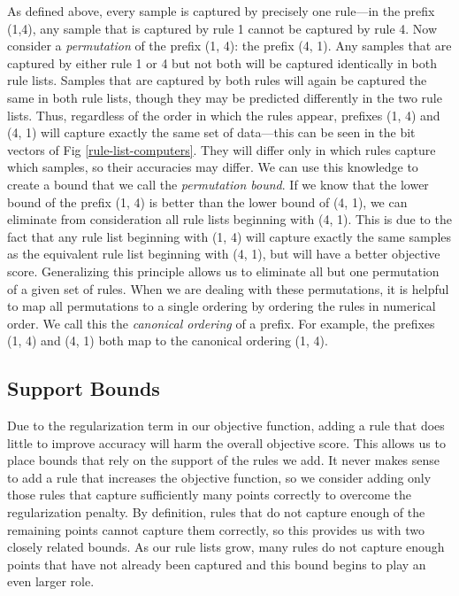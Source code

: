 As defined above, every sample is captured by precisely one rule---in the prefix (1,4), any sample that is captured by rule 1 cannot be captured by rule 4. 
Now consider a \textit{permutation} of the prefix (1, 4): the prefix (4, 1).
Any samples that are captured by either rule 1 or 4 but not both will be captured identically in both rule lists.
Samples that are captured by both rules will again be captured the same in both rule lists, though they may be predicted differently in the two rule lists.
Thus, regardless of the order in which the rules appear, prefixes (1, 4) and (4, 1) will capture exactly the same set of data---this can be seen in the bit vectors of Fig \ref{rule-list-computers}.
They will differ only in which rules capture which samples, so their accuracies may differ.
We can use this knowledge to create a bound that we call the \textit{permutation bound}.
If we know that the lower bound of the prefix (1, 4) is better than the lower bound of (4, 1), we can eliminate from consideration all rule lists beginning with (4, 1).
This is due to the fact that any rule list beginning with (1, 4) will capture exactly the same samples as the equivalent rule list beginning with (4, 1), but will have a better objective score.
Generalizing this principle allows us to eliminate all but one permutation of a given set of rules.
When we are dealing with these permutations, it is helpful to map all permutations to a single ordering by ordering the rules in numerical order.
We call this the \textit{canonical ordering} of a prefix.
For example, the prefixes (1, 4) and (4, 1) both map to the canonical ordering (1, 4).

\subsection{Support Bounds}
Due to the regularization term in our objective function, adding a rule that does little to improve accuracy will harm the overall objective score.
This allows us to place bounds that rely on the support of the rules we add.
It never makes sense to add a rule that increases the objective function, so we consider adding only those rules that capture sufficiently many points correctly to overcome the regularization penalty.
By definition, rules that do not capture enough of the remaining points cannot capture them correctly, so this provides us with two closely related bounds.
As our rule lists grow, many rules do not capture enough points that have not already been captured and this bound begins to play an even larger role.

